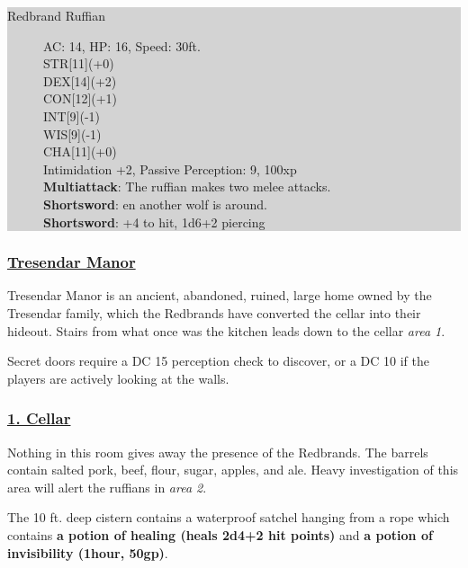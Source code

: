 \colorbox{lightgray}{\begin{minipage}{0.4\textwidth}
		\begin{description}
			\item[Redbrand Ruffian]
			AC: 14, HP: 16, Speed: 30ft.
			\\ STR[11](+0) 
			\\ DEX[14](+2)
			\\ CON[12](+1)
			\\ INT[9](-1)
			\\ WIS[9](-1)
			\\ CHA[11](+0) 
			\\ Intimidation +2, Passive Perception: 9, 100xp
			\\ \textbf{Multiattack}: The ruffian makes two melee attacks.
			\\ \textbf{Shortsword}: en another wolf is around.
			\\ \textbf{Shortsword}: +4 to hit, 1d6+2 piercing
		\end{description}
\end{minipage}}
\break

\subsubsection*{\underline{Tresendar Manor}}
Tresendar Manor is an ancient, abandoned, ruined, large home owned by the Tresendar family, which the Redbrands have converted the cellar into their hideout. Stairs from what once was the kitchen leads down to the cellar \emph{area 1}.

Secret doors require a DC 15 perception check to discover, or a DC 10 if the players are actively looking at the walls.

\subsubsection*{\underline{1. Cellar}}
Nothing in this room gives away the presence of the Redbrands. The barrels contain salted pork, beef, flour, sugar, apples, and ale. Heavy investigation of this area will alert the ruffians in \emph{area 2}.

The 10 ft. deep cistern contains a waterproof satchel hanging from a rope which contains \textbf{a potion of healing (heals 2d4+2 hit points)} and \textbf{a potion of invisibility (1hour, 50gp)}.


